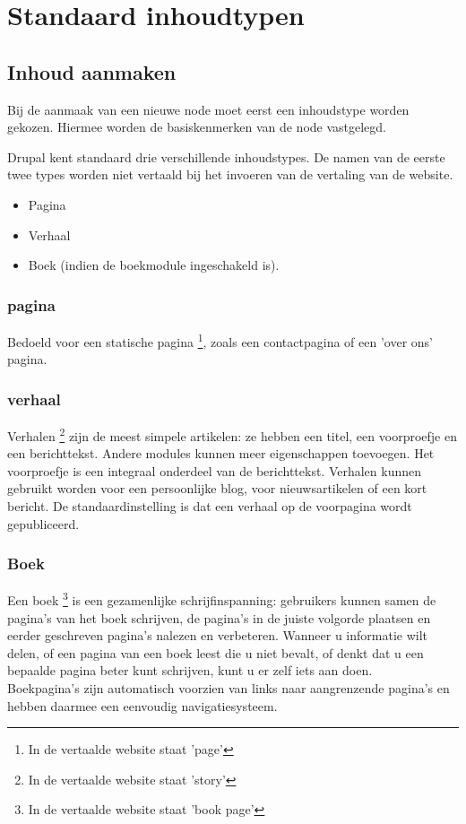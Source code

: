 \chapter{Standaard inhoudtypen} 
\section{Inhoud aanmaken}
Bij de aanmaak van een nieuwe node moet eerst een inhoudstype worden gekozen.
Hiermee worden de basiskenmerken van de node vastgelegd.

Drupal kent standaard drie verschillende inhoudstypes. De namen van de eerste
twee types worden niet vertaald bij het invoeren van de vertaling van de website.
\begin{itemize}
\item Pagina
\item Verhaal
\item Boek (indien de boekmodule ingeschakeld is).
\end{itemize}

\subsection{pagina}  
Bedoeld voor een statische pagina \footnote{In de vertaalde website staat
'page'}, zoals een contactpagina of een 'over ons' pagina.

\subsection{verhaal}  
Verhalen \footnote{In de vertaalde website staat 'story'} zijn de meest simpele
artikelen: ze hebben een titel, een voorproefje en een berichttekst. Andere modules 
kunnen meer eigenschappen toevoegen. Het voorproefje is een integraal onderdeel van de 
berichttekst. Verhalen kunnen gebruikt worden voor een persoonlijke blog, voor nieuwsartikelen of een kort bericht.
De standaardinstelling is dat een verhaal op de voorpagina wordt gepubliceerd.

\subsection{Boek} 

Een boek \footnote{In de vertaalde website staat 'book page'} is een
gezamenlijke schrijfinspanning: gebruikers kunnen samen de pagina's van het boek
schrijven, de pagina's in de juiste volgorde plaatsen en eerder geschreven
pagina's nalezen en verbeteren. Wanneer u informatie wilt delen, of een pagina van een boek leest die u niet bevalt, of denkt dat u een 
bepaalde pagina beter kunt schrijven, kunt u er zelf iets aan doen.
\\
Boekpagina's zijn automatisch voorzien van links naar aangrenzende pagina's en hebben daarmee een eenvoudig navigatiesysteem.


